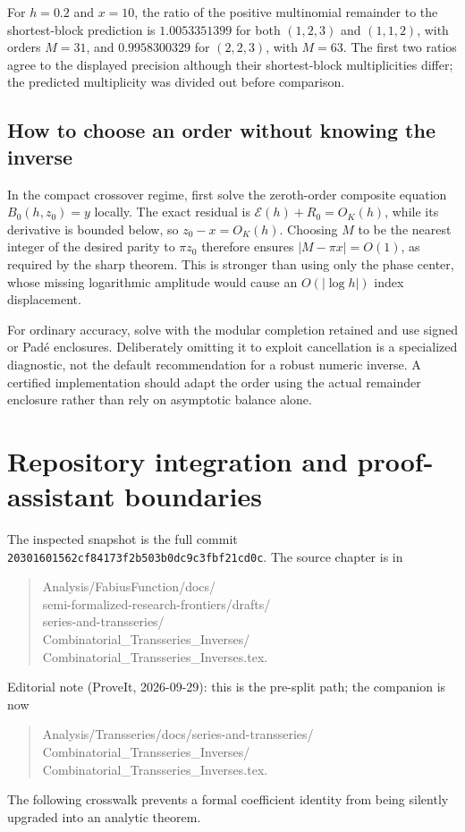 \documentclass[11pt,a4paper]{article}
\newcommand{\E}{\mathcal E}
\newcommand{\commit}{20301601562cf84173f2b503b0dc9c3fbf21cd0c}
\numberwithin{equation}{section}
\theoremstyle{plain}
\theoremstyle{definition}
\theoremstyle{remark}
\begin{document}
For $h=0.2$ and $x=10$, the ratio of the positive multinomial remainder to
the shortest-block prediction is $1.0053351399$ for both $(1,2,3)$ and
$(1,1,2)$, with orders $M=31$, and $0.9958300329$ for $(2,2,3)$, with
$M=63$. The first two ratios agree to the displayed precision although their
shortest-block multiplicities differ; the predicted multiplicity was divided
out before comparison.

\subsection{How to choose an order without knowing the inverse}
In the compact crossover regime, first solve the zeroth-order composite
 equation $B_0(h,z_0)=y$ locally. The exact residual is
$\E(h)+R_0=O_K(h)$, while its derivative is bounded below, so
$z_0-x=O_K(h)$. Choosing $M$ to be the nearest integer of the desired parity
to $\pi z_0$ therefore ensures $|M-\pi x|=O(1)$, as required by the sharp
 theorem. This is stronger than using only the phase center, whose missing
logarithmic amplitude would cause an $O(|\log h|)$ index displacement.

For ordinary accuracy, solve with the modular completion retained and use
signed or Pad\'e enclosures. Deliberately omitting it to exploit cancellation
is a specialized diagnostic, not the default recommendation for a robust
numeric inverse. A certified implementation should adapt the order using the
actual remainder enclosure rather than rely on asymptotic balance alone.

\section{Repository integration and proof-assistant boundaries}
\label{sec:integration}

The inspected snapshot is the full commit \texttt{\commit}. The source
chapter is in
\begin{quote}\small\ttfamily
Analysis/FabiusFunction/docs/\\
semi-formalized-research-frontiers/drafts/\\
series-and-transseries/\\
Combinatorial\_Transseries\_Inverses/\\
Combinatorial\_Transseries\_Inverses.tex.
\end{quote}
\noindent Editorial note (ProveIt, 2026-09-29): this is the pre-split path;
the companion is now
\begin{quote}\small\ttfamily
Analysis/Transseries/docs/series-and-transseries/\\
Combinatorial\_Transseries\_Inverses/\\
Combinatorial\_Transseries\_Inverses.tex.
\end{quote}
The following crosswalk prevents a formal coefficient identity from being
silently upgraded into an analytic theorem.
\end{document}
